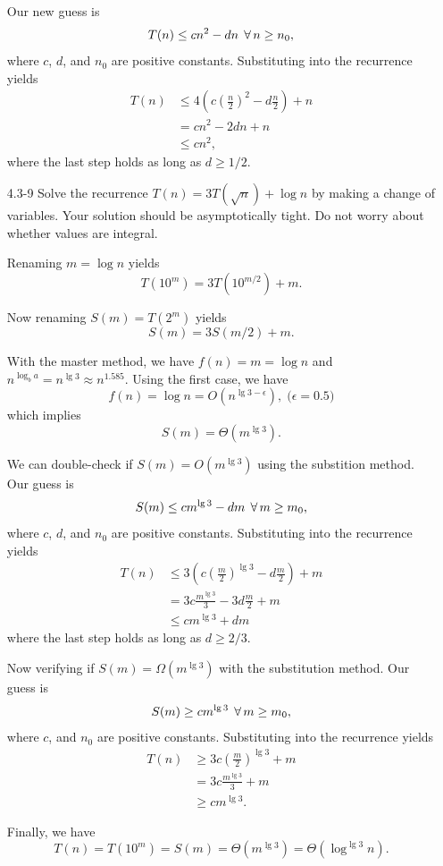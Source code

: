 \begin{enumerate}
\begin{framed}
Our new guess is
\[
T(n) \le c n^2 - dn \; \operatorname{\forall} n \ge n_0,
\]
where $c$, $d$, and $n_0$ are positive constants. Substituting into the
recurrence yields
\begin{equation*}
\begin{aligned}
T(n) &\le 4 \left(c \left(\frac{n}{2}\right)^2 - d\frac{n}{2} \right) + n\\
     &= c n^2 - 2dn + n\\
     &\le c n^2,
\end{aligned}
\end{equation*}
where the last step holds as long as $d \ge 1/2$.
\end{framed}

\item[4.3{-}9]{Solve the recurrence $T(n) = 3T(\sqrt{n}) + \log n$ by making
a change of variables.  Your solution should be asymptotically tight. Do not
worry about whether values are integral.}

\begin{framed}
Renaming $m = \log n$ yields
\[
T(10^m) = 3T(10^{m/2}) + m.
\]

Now renaming $S(m) = T(2^m)$ yields
\[
S(m) = 3S(m/2) + m.
\]

With the master method, we have $f(n) = m = \log n$ and
$n^{\log_b a} = n^{\lg 3} \approx n^{1.585}$. Using the first case, we have
\[
f(n) = \log n = O(n^{\lg 3 - \epsilon}), \; \text{($\epsilon = 0.5$)}
\]
which implies
\[
S(m) = \Theta(m^{\lg 3}).
\]

We can double-check if $S(m) = O(m^{\lg 3})$ using the substition method. Our
guess is
\[
S(m) \le c m^{\lg 3} - dm \; \operatorname{\forall} m \ge m_0,
\]
where $c$, $d$, and $n_0$ are positive constants. Substituting into the
recurrence yields
\begin{equation*}
\begin{aligned}
T(n) &\le 3 \left(c \left(\frac{m}{2}\right)^{\lg 3} - d \frac{m}{2}\right) + m\\
     &= 3 c \frac{m^{\lg 3}}{3} - 3d\frac{m}{2} + m\\
     &\le c m^{\lg 3} + dm
\end{aligned}
\end{equation*}
where the last step holds as long as $d \ge 2/3$.

Now verifying if $S(m) = \Omega(m^{\lg 3})$ with the substitution method. Our
guess is
\[
S(m) \ge c m^{\lg 3} \; \operatorname{\forall} m \ge m_0,
\]
where $c$, and $n_0$ are positive constants. Substituting into the
recurrence yields
\begin{equation*}
\begin{aligned}
T(n) &\ge 3 c \left(\frac{m}{2}\right)^{\lg 3} + m\\
     &= 3 c \frac{m^{\lg 3}}{3} + m\\
     &\ge c m^{\lg 3}.
\end{aligned}
\end{equation*}

Finally, we have
\[
T(n) = T(10^m) = S(m) = \Theta(m^{\lg 3}) = \Theta(\log^{\lg 3} n).
\]

\end{framed}

\end{enumerate}

